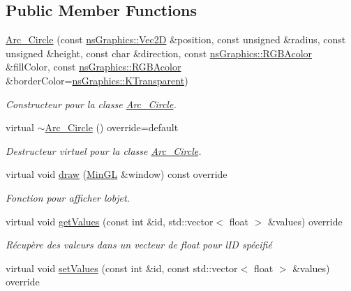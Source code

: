 \subsection*{Public Member Functions}
\begin{DoxyCompactItemize}
\item 
\hyperlink{classns_shape_1_1_arc___circle_a76dafed8fb69902ca33b784cce0a7975}{Arc\+\_\+\+Circle} (const \hyperlink{classns_graphics_1_1_vec2_d}{ns\+Graphics\+::\+Vec2D} \&position, const unsigned \&radius, const unsigned \&height, const char \&direction, const \hyperlink{classns_graphics_1_1_r_g_b_acolor}{ns\+Graphics\+::\+R\+G\+B\+Acolor} \&fill\+Color, const \hyperlink{classns_graphics_1_1_r_g_b_acolor}{ns\+Graphics\+::\+R\+G\+B\+Acolor} \&border\+Color=\hyperlink{namespacens_graphics_ab2001ad03cceb2565849e04465618c1e}{ns\+Graphics\+::\+K\+Transparent})
\begin{DoxyCompactList}\small\item\em Constructeur pour la classe \hyperlink{classns_shape_1_1_arc___circle}{Arc\+\_\+\+Circle}. \end{DoxyCompactList}\item 
virtual \hyperlink{classns_shape_1_1_arc___circle_a8b53fe0e24f1d0b1ad47331b8c66d289}{$\sim$\+Arc\+\_\+\+Circle} () override=default
\begin{DoxyCompactList}\small\item\em Destructeur virtuel pour la classe \hyperlink{classns_shape_1_1_arc___circle}{Arc\+\_\+\+Circle}. \end{DoxyCompactList}\item 
virtual void \hyperlink{classns_shape_1_1_arc___circle_a1e789ca962aeefd7dfd861eb0f75a6d7}{draw} (\hyperlink{class_min_g_l}{Min\+GL} \&window) const override
\begin{DoxyCompactList}\small\item\em Fonction pour afficher l\textquotesingle{}objet. \end{DoxyCompactList}\item 
virtual void \hyperlink{classns_shape_1_1_arc___circle_a11a5569112bf39b90192c7d7e0678736}{get\+Values} (const int \&id, std\+::vector$<$ float $>$ \&values) override
\begin{DoxyCompactList}\small\item\em Récupère des valeurs dans un vecteur de float pour l\textquotesingle{}ID spécifié \end{DoxyCompactList}\item 
virtual void \hyperlink{classns_shape_1_1_arc___circle_aa59b45d2a10ec5f8fd030d4ec46721b6}{set\+Values} (const int \&id, const std\+::vector$<$ float $>$ \&values) override

\end{DoxyCompactItemize}
